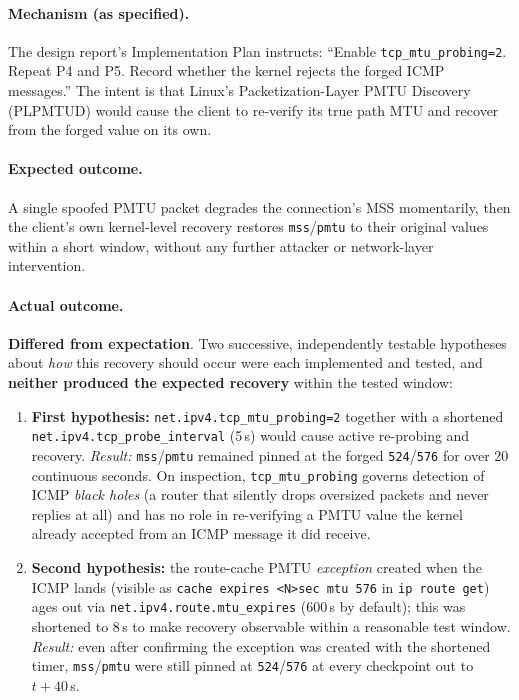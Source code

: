 \documentclass[11pt]{article}
\newcommand{\failed}{\textcolor{red!70!black}{\textbf{Differed from expectation}}}
\begin{document}
\paragraph{Mechanism (as specified).} The design report's Implementation
Plan instructs: ``Enable \texttt{tcp\_mtu\_probing=2}. Repeat P4 and P5.
Record whether the kernel rejects the forged ICMP messages.'' The
intent is that Linux's Packetization-Layer PMTU Discovery (PLPMTUD)
would cause the client to re-verify its true path MTU and recover from
the forged value on its own.

\paragraph{Expected outcome.} A single spoofed PMTU packet degrades the
connection's MSS momentarily, then the client's own kernel-level
recovery restores \texttt{mss}/\texttt{pmtu} to their original values
within a short window, without any further attacker or network-layer
intervention.

\paragraph{Actual outcome.} \failed. Two successive, independently
testable hypotheses about \emph{how} this recovery should occur were
each implemented and tested, and \textbf{neither produced the expected
recovery} within the tested window:

\begin{enumerate}
    \item \textbf{First hypothesis:} \texttt{net.ipv4.tcp\_mtu\_probing=2}
    together with a shortened \texttt{net.ipv4.tcp\_probe\_interval}
    (5\,s) would cause active re-probing and recovery. \emph{Result:}
    \texttt{mss}/\texttt{pmtu} remained pinned at the forged
    \texttt{524}/\texttt{576} for over 20 continuous seconds. On
    inspection, \texttt{tcp\_mtu\_probing} governs detection of ICMP
    \emph{black holes} (a router that silently drops oversized packets
    and never replies at all) and has no role in re-verifying a PMTU
    value the kernel already accepted from an ICMP message it did
    receive.
    \item \textbf{Second hypothesis:} the route-cache PMTU
    \emph{exception} created when the ICMP lands (visible as
    \texttt{cache expires <N>sec mtu 576} in \texttt{ip route get}) ages
    out via \texttt{net.ipv4.route.mtu\_expires} (600\,s by default);
    this was shortened to 8\,s to make recovery observable within a
    reasonable test window. \emph{Result:} even after confirming the
    exception was created with the shortened timer, \texttt{mss}/\texttt{pmtu}
    were still pinned at \texttt{524}/\texttt{576} at every checkpoint
    out to $t{+}40$\,s.
\end{enumerate}
\end{document}
